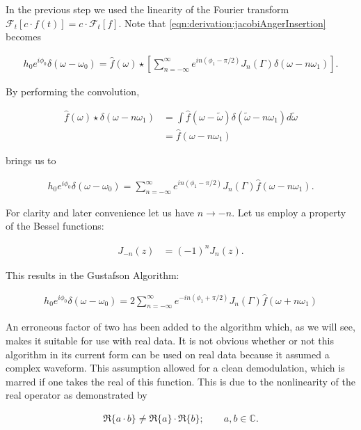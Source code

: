 \documentclass[onecolumn, groupedaddress, 10pt]{revtex4-1}
\begin{document}
In the previous step we used the linearity of the Fourier transform $\mathcal{F}_t[c \cdot f(t)] = c \cdot \mathcal{F}_t[f]$.  Note that \ref{eqn:derivation:jacobiAngerInsertion} becomes

\begin{align}
h_0 e^{i\phi_0} \delta (\omega - \omega_0) = \hat{f}(\omega)
\star
\left[ \sum_{n=-\infty}^{\infty} e^{in(\phi_1 - \pi/2)} J_n(\Gamma) \delta (\omega - n\omega_1) \right].
\end{align}

By performing the convolution,

\begin{align}
\hat{f}(\omega) \star \delta (\omega - n\omega_1) 
&= \int \hat{f}(\omega - \widetilde{\omega}) \delta(\widetilde{\omega} - n\omega_1) d\widetilde{\omega}			\\
&= \hat{f} (\omega - n\omega_1)
\end{align}

brings us to

\begin{align}
h_0 e^{i\phi_0} \delta (\omega - \omega_0) = \sum_{n=-\infty}^{\infty} e^{in(\phi_1-\pi/2)} J_n(\Gamma) \hat{f} (\omega - n\omega_1).
\end{align}

For clarity and later convenience let us have $n\to -n$.  Let us employ a property of the Bessel functions:

\begin{align}
J_{-n} (z) &= (-1)^n J_n(z).
\end{align}

This results in the Gustafson Algorithm:

\begin{align}
\label{eqn:gustafsonAlgorithm}
\boxed{h_0 e^{i\phi_0} \delta (\omega - \omega_0) = 2 \sum_{n=-\infty}^{\infty} e^{-in(\phi_1+\pi/2)} J_n(\Gamma) \hat{f} (\omega + n\omega_1)}
\end{align}


An erroneous factor of two has been added to the algorithm which, as we will see, makes it suitable for use with real data.  It is not obvious whether or not this algorithm in its current form can be used on real data because it assumed a complex waveform.  This assumption allowed for a clean demodulation, which is marred if one takes the real of this function.  This is due to the nonlinearity of the real operator as demonstrated by

\begin{align}
\Re \{ a \cdot b \} \neq \Re \{ a \} \cdot \Re \{ b \}; \qquad a,b \in \mathds{C}.
\end{align}
\end{document}
